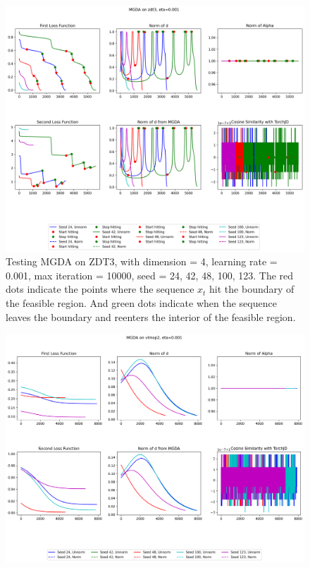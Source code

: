 \documentclass{article}
\renewcommand{\|}{\biggr|}
\begin{document}
    \begin{center}
        \begin{figure}[h]
            \includegraphics[scale=0.4]{MGDA_zdt3.png}
            \caption{Testing MGDA on ZDT3, with dimension = 4, learning rate = 0.001, max iteration = 10000, seed = 24, 42, 48, 100, 123. The red dots indicate the points where the sequence $x_t$ hit the boundary of the feasible region. And green dots indicate when the sequence leaves the boundary and reenters the interior of the feasible region.}
        \end{figure}
        \begin{figure}[h]
            \includegraphics[scale=0.4]{MGDA_vlmop2.png}

\end{figure}
\end{center}
\end{document}
